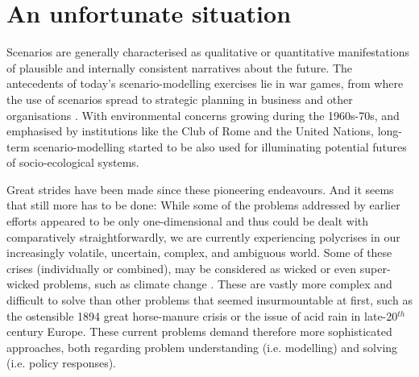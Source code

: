 \section{An unfortunate situation}

Scenarios are generally characterised as qualitative or quantitative manifestations of plausible and internally consistent narratives about the future. The antecedents of today's scenario-modelling exercises lie in war games, from where the use of scenarios spread to strategic planning in business and other organisations \parencite{bradfield_2005,schoemaker_1993}.\footnotemark{} With environmental concerns growing during the 1960s-70s, and emphasised by institutions like the Club of Rome and the United Nations, long-term scenario-modelling started to be also used for illuminating potential futures of socio-ecological systems.


Great strides have been made since these pioneering endeavours. And it seems that still more has to be done: While some of the problems addressed by earlier efforts appeared to be only one-dimensional and thus could be dealt with comparatively straightforwardly, we are currently experiencing polycrises in our increasingly volatile, uncertain, complex, and ambiguous world. Some of these crises (individually or combined), may be considered as wicked \parencite{rittel_1973, termeer_2019,lonngren_2021} or even super-wicked problems, such as climate change \parencite{levin_2012}. These are vastly more complex and difficult to solve than other problems that seemed insurmountable at first, such as the ostensible 1894 great horse-manure crisis or the issue of acid rain in late-20$^{th}$ century Europe. These current problems demand therefore more sophisticated approaches, both regarding problem understanding (i.e. modelling) and solving (i.e. policy responses). 

